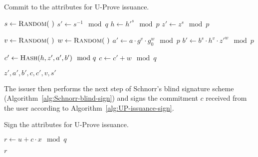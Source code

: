 \begin{algorithm}
  \caption{Commit to the attributes for U-Prove issuance.}
  \label{alg:UP-issuance-commit}
  \addtolength{\baselineskip}{1mm}
  \begin{algorithmic}[1]
      \State $s \gets \Call{Random}{~}$
      \State $s' \gets s^{-1} \mod q$
      \State $h \gets h'^s \mod p$
      \State $z' \gets z^s \mod p$

      \State $v \gets \Call{Random}{~}$
      \State $w \gets \Call{Random}{~}$
      \State $a' \gets a \cdot g^v \cdot g_0^w \mod p$
      \State $b' \gets b^s \cdot h^v \cdot z'^w \mod p$

      \State $c' \gets \Call{Hash}{h, z', a', b'} \mod q$
      \State $c \gets c' + w \mod q$

      \Return $z', a', b', c, c', v, s'$
    \EndFunction
  \end{algorithmic}
\end{algorithm}

The issuer then performs the next step of Schnorr's blind signature scheme
(Algorithm~\ref{alg:Schnorr-blind-sign}) and signs the commitment $c$ received
from the user according to Algorithm~\ref{alg:UP-issuance-sign}.

\begin{algorithm}
  \caption{Sign the attributes for U-Prove issuance.}
  \label{alg:UP-issuance-sign}
  \addtolength{\baselineskip}{1mm}
  \begin{algorithmic}[1]
      \State $r \gets u + c \cdot x \mod q$

      \Return $r$
    \EndFunction
  \end{algorithmic}
\end{algorithm}

